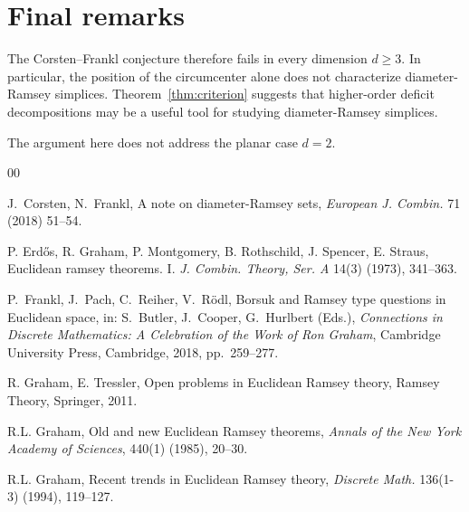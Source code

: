 \documentclass[preprint,12pt]{elsarticle}
\theoremstyle{remark}
\begin{document}
\section{Final remarks}
The Corsten--Frankl conjecture therefore fails in every dimension $d\ge 3$. In particular, the position of the circumcenter alone does not characterize diameter-Ramsey simplices. Theorem~\ref{thm:criterion} suggests that higher-order deficit decompositions may be a useful tool for studying diameter-Ramsey simplices.

The argument here does not address the planar case $d=2$.


\begin{thebibliography}{00}

J.\ Corsten, N.\ Frankl,
A note on diameter-Ramsey sets,
\textit{European J. Combin.} 71 (2018) 51--54.



P. Erd\H{o}s, R. Graham, P. Montgomery, B. Rothschild, J. Spencer,
E. Straus, Euclidean ramsey theorems. I. \emph{J. Combin. Theory,
Ser. A} 14(3) (1973), 341--363.

P.\ Frankl, J.\ Pach, C.\ Reiher, V.\ R\"odl,
Borsuk and Ramsey type questions in Euclidean space,
in: S.\ Butler, J.\ Cooper, G.\ Hurlbert (Eds.),
\textit{Connections in Discrete Mathematics: A Celebration of the Work of Ron Graham},
Cambridge University Press, Cambridge, 2018, pp.\ 259--277.


R. Graham, E. Tressler, Open problems in Euclidean Ramsey theory,
Ramsey Theory, Springer, 2011.

R.L. Graham, Old and new Euclidean Ramsey theorems, \emph{Annals of
the New York Academy of Sciences}, 440(1) (1985), 20--30.

R.L. Graham, Recent trends in Euclidean Ramsey theory,
\emph{Discrete Math.} 136(1-3) (1994), 119--127.


\end{thebibliography}
\end{document}
